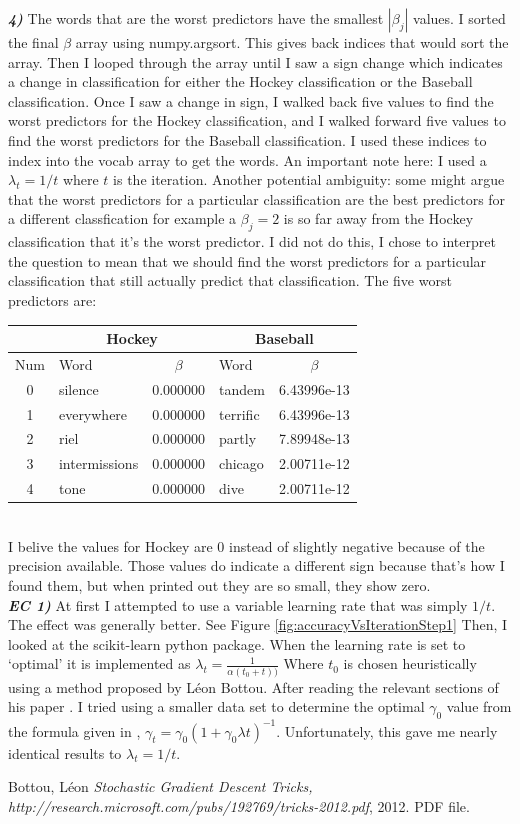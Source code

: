 \documentclass[10pt,letterpaper]{article}
\begin{document}
\textbf{\textit{4)}} The words that are the worst predictors have the smallest $|\beta_{j}|$ values.  I sorted the final $\beta$ array using numpy.argsort.  This gives back indices that would sort the array.  Then I looped through the array until I saw a sign change which indicates a change in classification for either the Hockey classification or the Baseball classification.  Once I saw a change in sign, I walked back five values to find the worst predictors for the Hockey classification, and I walked forward five values to find the worst predictors for the Baseball classification.  I used these indices to index into the vocab array to get the words.  An important note here: I used a $\lambda_t = 1 / t$ where $t$ is the iteration.  Another potential ambiguity: some might argue that the worst predictors for a particular classification are the best predictors for a different classfication for example a $\beta_j = 2$ is so far away from the Hockey classification that it's the worst predictor.  I did not do this, I chose to interpret the question to mean that we should find the worst predictors for a particular classification that still actually predict that classification.
The five worst predictors are:\\
\begin{tabular}{c|l|c||l|c}
  & \multicolumn{2}{|c||}{Hockey} & \multicolumn{2}{c}{Baseball}\\
  \hline
  Num & Word & $\beta$ & Word & $\beta$\\
  \hline
  0 & silence & 0.000000 & tandem & 6.43996e-13\\
  1 & everywhere & 0.000000 & terrific & 6.43996e-13\\
  2 & riel & 0.000000 & partly & 7.89948e-13\\
  3 & intermissions & 0.000000 & chicago & 2.00711e-12\\
  4 & tone & 0.000000 & dive & 2.00711e-12\\
\end{tabular}
\\
I belive the values for Hockey are 0 instead of slightly negative because of the precision available.  Those values do indicate a different sign because that's how I found them, but when printed out they are so small, they show zero.
\\

\textbf{\textit{EC 1)}} At first I attempted to use a variable learning rate that was simply $1 / t$.   The effect was generally better.  See Figure \ref{fig:accuracyVsIterationStep1}
Then, I looked at the scikit-learn python package.  When the learning rate is set to `optimal' it is implemented as $\lambda_{t} = \frac{1}{\alpha(t_0 + t))}$
Where $t_0$ is chosen heuristically using a method proposed by L\'eon Bottou.  After reading the relevant sections of his paper \cite{sgdpaper}.  I tried using a smaller data set to determine the optimal $\gamma_0$ value from the formula given in \cite{sgdpaper}, $\gamma_t = \gamma_{0}(1 + \gamma_{0}\lambda t)^{-1}$.  Unfortunately, this gave me nearly identical results to $\lambda_t = 1 / t$.


\begin{thebibliography}{1}
   Bottou, L\'eon {\em Stochastic Gradient Descent Tricks,  http://research.microsoft.com/pubs/192769/tricks-2012.pdf}, 2012. PDF file.
\end{thebibliography}
\end{document}
